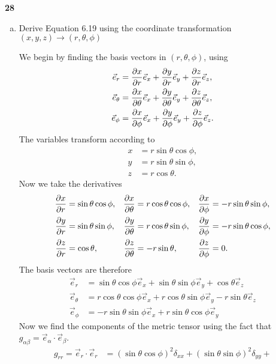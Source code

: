 \documentclass[gr-notes.tex]{subfiles}
\begin{document}
\textbf{28}
\begin{enumerate}[(a)]
\item Derive Equation 6.19 using the coordinate transformation
  $(x,y,z) \to (r,\theta,\phi)$

We begin by finding the basis vectors in $(r,\theta,\phi)$, using
%
\begin{align*}
  \vec{e}_r &=
  \pdv{x}{r} \vec{e}_x +
  \pdv{y}{r} \vec{e}_y +
  \pdv{z}{r} \vec{e}_z,
  \\
  \vec{e}_\theta &=
  \pdv{x}{\theta} \vec{e}_x +
  \pdv{y}{\theta} \vec{e}_y +
  \pdv{z}{\theta} \vec{e}_z,
  \\
  \vec{e}_\phi &=
  \pdv{x}{\phi} \vec{e}_x +
  \pdv{y}{\phi} \vec{e}_y +
  \pdv{z}{\phi} \vec{e}_z.
\end{align*}
%
The variables transform according to
%
\begin{align*}
  x &= r \sin\theta \cos\phi,
  \\
  y &= r \sin\theta \sin\phi,
  \\
  z &= r \cos\theta.
\end{align*}
%
Now we take the derivatives
%
\begin{align*}
  \pdv{x}{r}      &=    \sin\theta \cos\phi, &
  \pdv{x}{\theta} &=  r \cos\theta \cos\phi, &
  \pdv{x}{\phi}   &= -r \sin\theta \sin\phi,
  \\
  \pdv{y}{r}      &=    \sin\theta \sin\phi, &
  \pdv{y}{\theta} &=  r \cos\theta \sin\phi, &
  \pdv{y}{\phi}   &= -r \sin\theta \cos\phi,
  \\
  \pdv{z}{r}      &=    \cos\theta, &
  \pdv{z}{\theta} &= -r \sin\theta, &
  \pdv{z}{\phi}   &=  0.
\end{align*}
%
The basis vectors are therefore
%
\begin{align*}
  \vec{e}_r &=
    \sin\theta \cos\phi \vec{e}_x +
    \sin\theta \sin\phi \vec{e}_y +
    \cos\theta          \vec{e}_z
  \\
  \vec{e}_\theta &=
  r \cos\theta \cos\phi \vec{e}_x +
  r \cos\theta \sin\phi \vec{e}_y -
  r \sin\theta          \vec{e}_z
  \\
  \vec{e}_\phi &=
 -r \sin\theta \sin\phi \vec{e}_x +
  r \sin\theta \cos\phi \vec{e}_y
\end{align*}
%
Now we find the components of the metric tensor using the fact that
$g_{\alpha\beta} = \vec{e}_\alpha \cdot \vec{e}_\beta$.
%
\begin{align*}
  g_{rr} =
  \vec{e}_r \cdot \vec{e}_r &=
  (\sin\theta \cos\phi)^2 \delta_{xx} +
  (\sin\theta \sin\phi)^2 \delta_{yy} +

\end{align*}
\end{enumerate}
\end{document}
